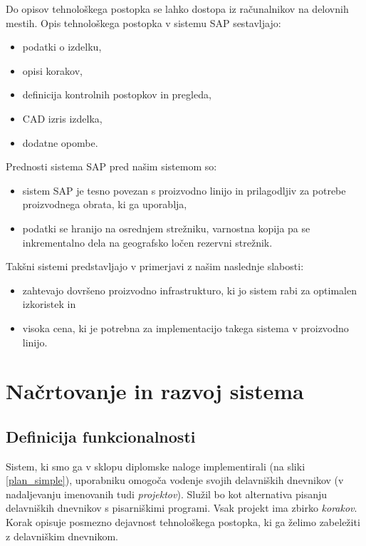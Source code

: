\documentclass[a4paper, 12pt]{book}
\begin{document}
Do opisov tehnološkega postopka se lahko dostopa iz računalnikov na delovnih mestih.
Opis tehnološkega postopka v sistemu SAP sestavljajo:
\begin{itemize}
	\item podatki o izdelku,
	\item opisi korakov,
	\item definicija kontrolnih postopkov in pregleda, 
	\item CAD izris izdelka,
	\item dodatne opombe.
\end{itemize}

\noindent Prednosti sistema SAP pred našim sistemom so:
\begin{itemize}
	\item sistem SAP je tesno povezan s proizvodno linijo in prilagodljiv za potrebe proizvodnega obrata, ki ga uporablja,
	\item podatki se hranijo na osrednjem strežniku, varnostna kopija pa se inkrementalno dela na geografsko ločen rezervni strežnik.
\end{itemize}

Takšni sistemi predstavljajo v primerjavi z našim naslednje slabosti:
\begin{itemize}
	\item zahtevajo dovršeno proizvodno infrastrukturo, ki jo sistem rabi za optimalen izkoristek in
	\item visoka cena, ki je potrebna za implementacijo takega sistema v proizvodno linijo.
\end{itemize}




\chapter{Načrtovanje in razvoj sistema}



\section{Definicija funkcionalnosti} \label{architecture}

Sistem, ki smo ga v sklopu diplomske naloge implementirali (na sliki \ref{plan_simple}), uporabniku omogoča vodenje svojih delavniških dnevnikov (v nadaljevanju imenovanih tudi \textit{projektov}).
Služil bo kot alternativa pisanju delavniških dnevnikov s pisarniškimi programi.
Vsak projekt ima zbirko \textit{korakov}.
Korak opisuje posmezno dejavnost tehnološkega postopka, ki ga želimo zabeležiti z delavniškim dnevnikom.
\end{document}
